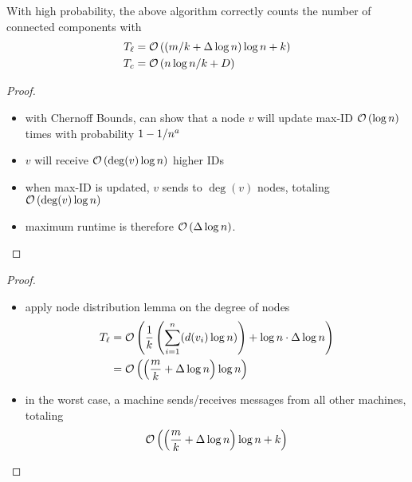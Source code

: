 \begin{frame}
    \begin{theorem}\label{thm:flooding-thm}
        With high probability, the above algorithm correctly counts the number
        of connected components with
        \begin{align*}
            T_{\ell} & = \mathcal{O}\left((m/k + \Delta\log n) \log n + k\right) \\
            T_c & = \mathcal{O}\left(n\log n/k + D\right)
        \end{align*}
    \end{theorem}
    \begin{proof}
        \begin{itemize}
            \item with Chernoff Bounds, can show that a node $v$ will update max-ID
                  $\mathcal{O}\left(\log{n}\right)$ times with probability $1 - 1 / n^a$
            \item $v$ will receive $\mathcal{O}\left(\deg(v)\log{n}\right)$ higher IDs
            \item when max-ID is updated, $v$ sends to $\deg(v)$ nodes, totaling $\mathcal{O}\left(\deg(v)\log{n}\right)$
            \item maximum runtime is therefore $\mathcal{O}\left(\Delta\log{n}\right)$.
        \end{itemize}
    \end{proof}
\end{frame}

\begin{frame}
    \begin{proof}
        \begin{itemize}
            \item apply node distribution lemma on the degree of nodes
                  \begin{align*}
                      T_{\ell} & = \mathcal{O}\left(\frac{1}{k}\left(\sum_{i=1}^n (d(v_i) \log n)\right) + \log n \cdot \Delta \log n\right) \\
                           & = \mathcal{O}\left(\left(\frac{m}{k} + \Delta \log n\right) \log n\right)
                  \end{align*}
            \item in the worst case, a machine sends/receives messages from all other machines, totaling
                  \[\mathcal{O}\left(\left(\frac{m}{k} + \Delta \log n\right) \log n + k\right)\]
        \end{itemize}
    \end{proof}
\end{frame}

